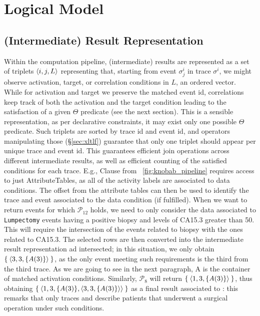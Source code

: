 \section{Logical Model}

\subsection{(Intermediate) Result Representation}
Within the computation pipeline, (intermediate) results are represented as a set of triplets $\braket{i,j,L}$ representing that, starting from event $\sigma^i_j$ in trace $\sigma^i$, we might observe activation, target, or correlation conditions in $L$, an ordered vector.  While for activation and target 
we 
preserve 
the matched event id,
correlations keep track of
both the activation and the target condition leading to the satisfaction of a given $\Theta$ predicate (see the next section). This is a sensible representation, as per declarative constraints, it may exist only one possible $\Theta$ predicate. Such triplets are sorted by trace id and event id, and operators manipulating those (\S\ref{sec:xltlf}) guarantee that only one triplet should appear per unique trace and event id. This guarantees efficient join operations across different intermediate results, as well as efficient counting of the satisfied conditions for each trace. %
E.g., Clause  from \figurename~\ref{fig:knobab_pipeline} requires access to just \textsf{AttributeTable}s, as all of the activity labels are associated to data conditions. {The offset from the attribute tables can then be used to identify the trace and event associated to the data condition (if fulfilled).} When we want to return events for which $\mathcal{P}_{12}$ holds, we need to only consider the data associated to \texttt{Lumpectomy} events having a positive biopsy and levels of CA15.3 greater than 50. This will require the intersection of the events related to biopsy with the ones related to CA15.3. The selected rows are then  converted into the intermediate result representation ad intersected; in this situation, we only obtain $\Set{\braket{3,\mbox{}\mbox{{3}},\{A(\mbox{}\mbox{{3}})\}}}$, as the only event meeting such requirements is the {third} from the third trace. 
As we are going to see in the next paragraph, A is the container of matched activation conditions. 
Similarly, $\mathcal{P}_{8}$ will return $\Set{\braket{\mbox{}\mbox{{1}},\mbox{}\mbox{{3}},\{A(\mbox{}\mbox{{3}})\}}}$, thus obtaining $\Set{\braket{1,\mbox{}\mbox{{3}},\{A(\mbox{}\mbox{{3}})\},\braket{3,\mbox{}\mbox{{3}},\{A(\mbox{}\mbox{{3}})\}}}}$ as a final result associated to : this remarks that only traces  and  describe patients that underwent a surgical operation under such conditions.

